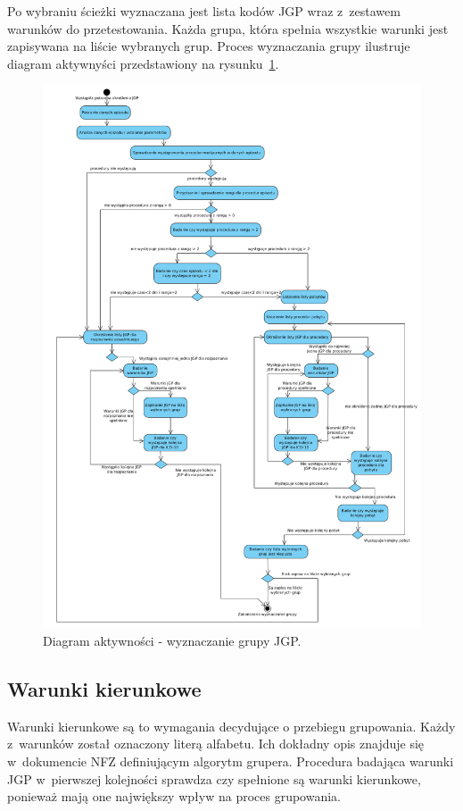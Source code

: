 Po wybraniu ścieżki wyznaczana jest lista kodów JGP wraz z~zestawem warunków do przetestowania. Każda grupa, która spełnia wszystkie warunki jest zapisywana na liście wybranych grup. Proces wyznaczania grupy ilustruje diagram aktywnyści przedstawiony na rysunku~\ref{img:diagram_activity_jgp}.
\newpage
\begin{figure}[!ht]
\centering
\includegraphics[scale=0.4]{images/activity-jgp} 
\caption[Diagram aktywności]{Diagram aktywności - wyznaczanie grupy JGP.}
\label{img:diagram_activity_jgp}
\end{figure}

\subsection{Warunki kierunkowe}
\label{sec:warunkiKierunkowe}
Warunki kierunkowe są to wymagania decydujące o przebiegu grupowania. Każdy z~warunków został oznaczony literą alfabetu. Ich dokładny opis znajduje się w~dokumencie NFZ definiującym algorytm grupera\cite{algorytm_grupera}. Procedura badająca warunki JGP w~pierwszej kolejności sprawdza czy spełnione są warunki kierunkowe, ponieważ mają one największy wpływ na proces grupowania.


